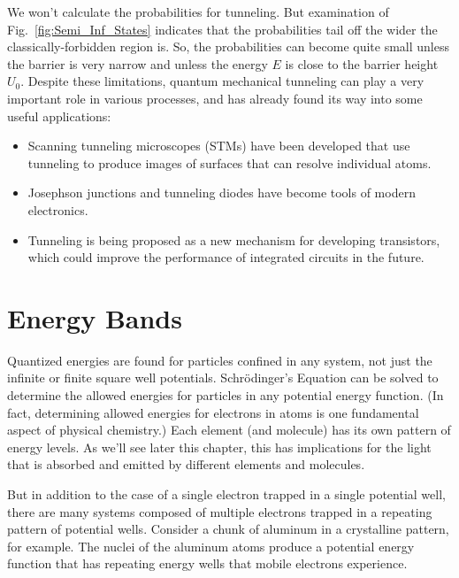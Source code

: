We won't calculate the probabilities for tunneling. But examination of
Fig.~\ref{fig:Semi_Inf_States} indicates
that the probabilities tail off the wider the classically-forbidden region
is. So, the probabilities can become quite small unless the barrier is very
narrow and unless the energy $E$ is close to the barrier height $U_0$.
Despite these limitations, quantum mechanical tunneling can play a very
important role in various processes, and has already found its way into
some useful applications: 
\begin{itemize}
\item Scanning tunneling microscopes (STMs) have been developed that use
tunneling to produce images of surfaces that can resolve individual atoms.
\item Josephson junctions and tunneling diodes have become tools of modern
electronics. 
\item Tunneling is being proposed as a new mechanism for developing
transistors, which could improve the performance of integrated circuits
in the future.
\end{itemize}

\section{Energy Bands}

Quantized energies are found for particles confined in any system, not
just the infinite or finite square well potentials. Schr\"{o}dinger's
Equation can be solved to determine the allowed energies for particles 
in any potential energy function. (In fact, determining allowed energies
for electrons in atoms is one fundamental aspect of physical 
chemistry.) Each element (and molecule) has its 
own pattern of energy levels. As we'll see later this chapter, this 
has implications for the light that is absorbed and emitted by different
elements and molecules.

But in addition to the case of a single electron trapped in a single 
potential well, there are many systems composed of multiple electrons
trapped in a repeating pattern of potential wells. Consider a chunk
of aluminum in a crystalline pattern, for example. The nuclei of
the aluminum atoms produce a potential energy function that has
repeating energy wells that mobile electrons experience.

